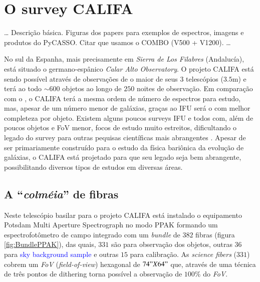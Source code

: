 \section{O survey CALIFA}
\label{sec:CALePyC:Apresent}

\ldots
Descrição básica. Figuras dos papers para exemplos de espectros, imagens e 
produtos do PyCASSO. Citar que usamos o COMBO (V500 + V1200).
\ldots

No sul da Espanha, mais precisamente em {\em Sierra de Los Filabres}
(Andalucía), está situado o germano-espânico {\em Calar Alto Observatory}. O
projeto CALIFA está sendo possível através de observações de o maior de seus
$3$ telescópios ($3.5$m) e terá ao todo $\sim600$ objetos ao longo de $250$
noites de observação. Em comparação com o \SDSS, o CALIFA terá a mesma ordem de
número de espectros para estudo, mas, apesar de um número menor de galáxias,
graças ao IFU será o com melhor completeza por objeto. Existem alguns poucos
surveys IFU e todos com, além de poucos objetos e FoV menor, focos de estudo
muito estreitos, dificultando o legado do survey para outras pequisas
científicas mais abrangentes \citep[SAURON; ][região central de 72 galáxias
com $z < 0.01$.]{de-Zeeuw2002} \citep[PINGS; ][algumas galáxias muito próximas
($\sim10$ Mpc) e o estudo atual de 70 (U)LIRGs com $z <0.26$]{RosalesOrtega2010}
\citep[VENGA; ][$30$ galáxias espirais]{Blanc2010}. Apesar de ser primariamente
construído para o estudo da física bariônica da evolução de galáxias, o CALIFA
está projetado para que seu legado seja bem abrangente, possibilitando diversos
tipos de estudos em diversas áreas.

\subsection{A ``{\em colméia}'' de fibras}

Neste telescópio basilar para o projeto CALIFA está instalado o equipamento
Potsdam Multi Aperture Spectrograph \citep[PMAS; ][]{Roth2005} no modo PPAK
\citep{Verheijen2004, Kelz2006} formando um espectrofotômetro de campo integrado
com um {\em bundle} de $382$ fibras (figura \ref{fig:BundlePPAK}), das quais,
$331$ são para observação dos objetos, outras $36$ para \ojo
\textcolor{blue}{sky background sample} e outras $15$ para calibração. As {\em
science fibers} ($331$) cobrem um {\em FoV} ({\em field-of-view}) hexagonal de
$74" X 64"$ que, através de uma técnica de três pontos de dithering \ojo torna
possível a observação de $100\%$ do {\em FoV}.

